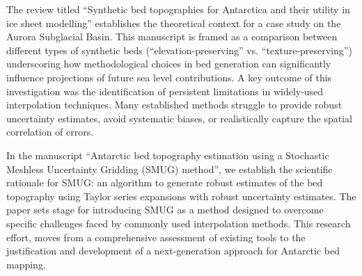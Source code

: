 The review titled ``Synthetic bed topographies for Antarctica and their utility in ice sheet modelling'' establishes the theoretical context for a case study on the Aurora Subglacial Basin. This manuscript is framed as a comparison between different types of synthetic beds (``elevation-preserving'' vs. ``texture-preserving'') underscoring how methodological choices in bed generation can significantly influence projections of future sea level contributions. A key outcome of this investigation was the identification of persistent limitations in widely-used interpolation techniques. Many established methods struggle to provide robust uncertainty estimates, avoid systematic biases, or realistically capture the spatial correlation of errors.

In the manuscript ``Antarctic bed topography estimation using a Stochastic Meshless Uncertainty Gridding (SMUG) method'', we establish the scientific rationale for SMUG: an algorithm to generate robust estimates of the bed topography using Taylor series expansions with robust uncertainty estimates. The paper sets stage for introducing SMUG as a method designed to overcome specific challenges faced by commonly used interpolation methods. This research effort, moves from a comprehensive assessment of existing tools to the justification and development of a next-generation approach for Antarctic bed mapping.



